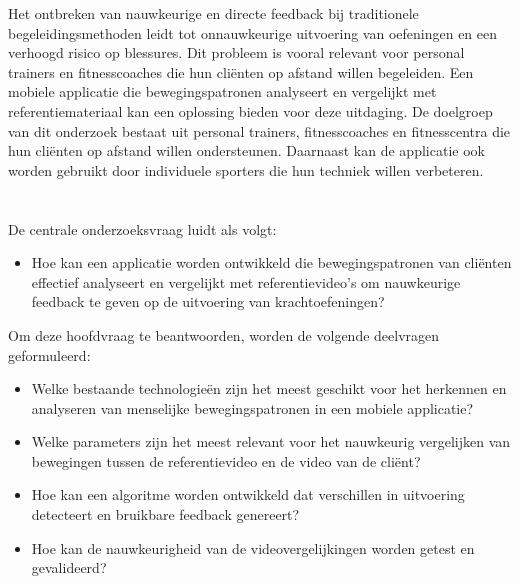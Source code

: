 Het ontbreken van nauwkeurige en directe feedback bij traditionele begeleidingsmethoden leidt tot onnauwkeurige uitvoering van oefeningen en een verhoogd risico op blessures. Dit probleem is vooral relevant voor personal trainers en fitnesscoaches die hun cliënten op afstand willen begeleiden. Een mobiele applicatie die bewegingspatronen analyseert en vergelijkt met referentiemateriaal kan een oplossing bieden voor deze uitdaging.
\medskip
De doelgroep van dit onderzoek bestaat uit personal trainers, fitnesscoaches en fitnesscentra die hun cliënten op afstand willen ondersteunen. Daarnaast kan de applicatie ook worden gebruikt door individuele sporters die hun techniek willen verbeteren.

\section{}%
\label{sec:onderzoeksvraag}

De centrale onderzoeksvraag luidt als volgt:

\begin{itemize}
    \item Hoe kan een applicatie worden ontwikkeld die bewegingspatronen van cliënten effectief analyseert en vergelijkt met referentievideo’s om nauwkeurige feedback te geven op de uitvoering van krachtoefeningen?  
\end{itemize}

Om deze hoofdvraag te beantwoorden, worden de volgende deelvragen geformuleerd:

\begin{itemize}
    \item Welke bestaande technologieën zijn het meest geschikt voor het herkennen en analyseren van menselijke bewegingspatronen in een mobiele applicatie?
    \item Welke parameters zijn het meest relevant voor het nauwkeurig vergelijken van bewegingen tussen de referentievideo en de video van de cliënt?
    \item Hoe kan een algoritme worden ontwikkeld dat verschillen in uitvoering detecteert en bruikbare feedback genereert?
    \item Hoe kan de nauwkeurigheid van de videovergelijkingen worden getest en gevalideerd?
\end{itemize}

\section{}%
\label{sec:onderzoeksdoelstelling}

